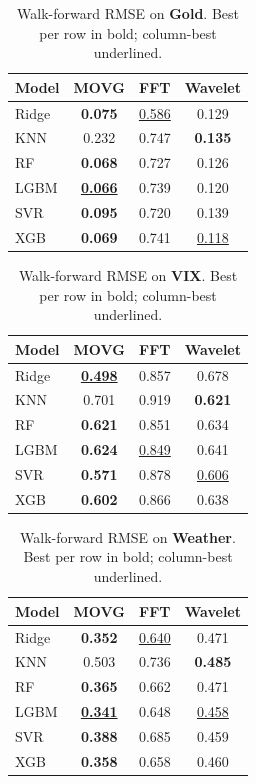 \documentclass[a4paper,12pt]{article}
\begin{document}
\begin{table}[ht]
\centering
\caption{Walk-forward RMSE on \textbf{Gold}. Best per row in bold; column-best underlined.}
\label{tab:per_ds_gold_close}
\begin{tabular}{lccc}
\toprule
Model & MOVG & FFT & Wavelet \\
\midrule
Ridge & \textbf{0.075} & \underline{0.586} & 0.129 \\
KNN & 0.232 & 0.747 & \textbf{0.135} \\
RF & \textbf{0.068} & 0.727 & 0.126 \\
LGBM & \underline{\textbf{0.066}} & 0.739 & 0.120 \\
SVR & \textbf{0.095} & 0.720 & 0.139 \\
XGB & \textbf{0.069} & 0.741 & \underline{0.118} \\
\bottomrule
\end{tabular}
\end{table}

\begin{table}[ht]
\centering
\caption{Walk-forward RMSE on \textbf{VIX}. Best per row in bold; column-best underlined.}
\label{tab:per_ds_vix_close}
\begin{tabular}{lccc}
\toprule
Model & MOVG & FFT & Wavelet \\
\midrule
Ridge & \underline{\textbf{0.498}} & 0.857 & 0.678 \\
KNN & 0.701 & 0.919 & \textbf{0.621} \\
RF & \textbf{0.621} & 0.851 & 0.634 \\
LGBM & \textbf{0.624} & \underline{0.849} & 0.641 \\
SVR & \textbf{0.571} & 0.878 & \underline{0.606} \\
XGB & \textbf{0.602} & 0.866 & 0.638 \\
\bottomrule
\end{tabular}
\end{table}

\begin{table}[ht]
\centering
\caption{Walk-forward RMSE on \textbf{Weather}. Best per row in bold; column-best underlined.}
\label{tab:per_ds_weather_temp}
\begin{tabular}{lccc}
\toprule
Model & MOVG & FFT & Wavelet \\
\midrule
Ridge & \textbf{0.352} & \underline{0.640} & 0.471 \\
KNN & 0.503 & 0.736 & \textbf{0.485} \\
RF & \textbf{0.365} & 0.662 & 0.471 \\
LGBM & \underline{\textbf{0.341}} & 0.648 & \underline{0.458} \\
SVR & \textbf{0.388} & 0.685 & 0.459 \\
XGB & \textbf{0.358} & 0.658 & 0.460 \\
\bottomrule
\end{tabular}
\end{table}
\end{document}
